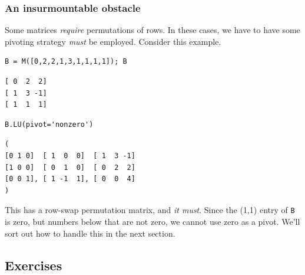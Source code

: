 \documentclass[10pt,]{book}
\theoremstyle{plain}
\numberwithin{equation}{section}
\begin{document}
\subsubsection[An insurmountable obstacle]{An insurmountable obstacle}\label{subsubsection-28}

        Some matrices \emph{require} permutations of rows. In these cases, we
        have to have some pivoting strategy \emph{must} be employed. Consider this
        example.
\begin{lstlisting}[style=sageinput]
B = M([0,2,2,1,3,1,1,1,1]); B
\end{lstlisting}
\begin{lstlisting}[style=sageoutput]
[ 0  2  2]
[ 1  3 -1]
[ 1  1  1]
\end{lstlisting}
\begin{lstlisting}[style=sageinput]
B.LU(pivot='nonzero')
\end{lstlisting}
\begin{lstlisting}[style=sageoutput]
(
[0 1 0]  [ 1  0  0]  [ 1  3 -1]
[1 0 0]  [ 0  1  0]  [ 0  2  2]
[0 0 1], [ 1 -1  1], [ 0  0  4]
)
\end{lstlisting}
\par

        This has a row-swap permutation matrix, and \emph{it must}. Since the
        (1,1) entry of \verb?B? is zero, but numbers below that are not zero,
        we cannot use zero as a pivot. We'll sort out how to handle this in the next
        section.
\typeout{************************************************}
\typeout{************************************************}
\subsection[Exercises]{Exercises}\label{subsection-50}
\end{document}
